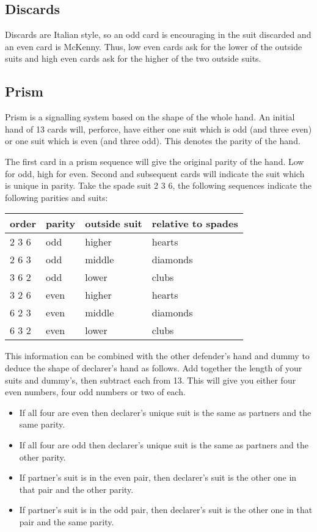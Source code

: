 \documentclass[a4paper,14pt]{extarticle}
\begin{document}
\subsection{Discards}
\label{sec:card:discards}

Discards are Italian style, so an odd card is encouraging in the suit discarded
and an even card is McKenny. Thus, low even cards ask for the lower of the
outside suits and high even cards ask for the higher of the two outside
suits.

\newpage
\subsection{Prism}
\label{sec:card:prism}

Prism is a signalling system based on the shape of the whole hand. An initial
hand of 13 cards will, perforce, have either one suit which is odd (and three
even) or one suit which is even (and three odd). This denotes the parity of the
hand.

The first card in a prism sequence will give the original parity of the hand.
Low for odd, high for even. Second and subsequent cards will indicate the suit
which is unique in parity. Take the spade suit 2 3 6, the following sequences indicate
the following parities and suits:

\begin{tabular}{llll}
\bf order & \bf parity & \bf outside suit & \bf relative to spades \\
\hline
2 3 6 & odd    & higher       & hearts \\
2 6 3 & odd    & middle       & diamonds \\
3 6 2 & odd    & lower        & clubs \\
3 2 6 & even   & higher       & hearts \\
6 2 3 & even   & middle       & diamonds \\
6 3 2 & even   & lower        & clubs \\
\end{tabular}

This information can be combined with the other defender's hand and dummy to
deduce the shape of declarer's hand as follows. Add together the length of your
suits and dummy's, then subtract each from 13. This will give you either four
even numbers, four odd numbers or two of each.

\begin{itemize}
\item If all four are even then declarer's unique suit is the same as partners and the same parity.
\item If all four are odd then declarer's unique suit is the same as partners and the other parity.
\item If partner's suit is in the even pair, then declarer's suit is the other one in that pair and the other parity.
\item If partner's suit is in the odd pair, then declarer's suit is the other one in that pair and the same parity.
\end{itemize}
\end{document}
